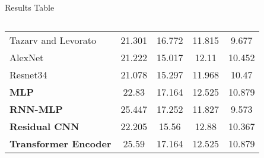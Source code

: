 \begin{frame}{Results Table}
\begin{columns}
\begin{table}
{\begin{tabular}{lSSSS}
                    Tazarv and Levorato \cite{tazarv_deep_2021}     & 21.301                                 & 16.772                         & 11.815           & 9.677            \\
                    AlexNet \cite{schrumpf_assessment_2021}         & 21.222                                 & 15.017                         & 12.11            & 10.452           \\
                    Resnet34 \cite{schrumpf_assessment_2021}        & 21.078                                 & 15.297                         & 11.968           & 10.47            \\
                    \textbf{MLP}                                    & 22.83                                  & 17.164                         & 12.525           & 10.879           \\
                    \textbf{RNN-MLP}                                & 25.447                                 & 17.252                         & 11.827           & 9.573            \\
                    \textbf{Residual CNN}                           & 22.205                                 & 15.56                          & 12.88            & 10.367           \\
                    \textbf{Transformer Encoder}                    & 25.59                                  & 17.164                         & 12.525           & 10.879           \\


\end{tabular}}
\end{table}
\end{columns}
\end{frame}
